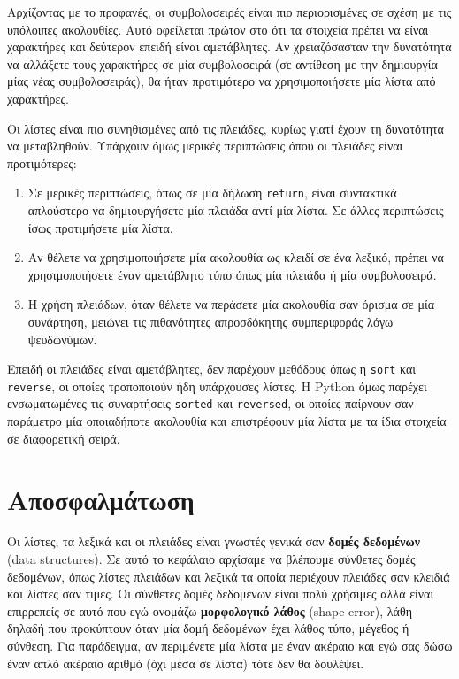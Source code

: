 \documentclass[10pt]{book}
\begin{document}
Αρχίζοντας με το προφανές, οι συμβολοσειρές είναι πιο περιορισμένες σε σχέση με τις υπόλοιπες ακολουθίες. Αυτό οφείλεται πρώτον στο ότι τα στοιχεία πρέπει να είναι χαρακτήρες και δεύτερον επειδή είναι αμετάβλητες. Αν χρειαζόσασταν την δυνατότητα να αλλάξετε τους χαρακτήρες σε μία συμβολοσειρά (σε αντίθεση με την δημιουργία μίας νέας συμβολοσειράς), θα ήταν προτιμότερο να χρησιμοποιήσετε μία λίστα από χαρακτήρες.

Οι λίστες είναι πιο συνηθισμένες από τις πλειάδες, κυρίως γιατί έχουν τη δυνατότητα να μεταβληθούν. Υπάρχουν όμως μερικές περιπτώσεις όπου οι πλειάδες είναι προτιμότερες:

\begin{enumerate}

\item  Σε μερικές περιπτώσεις, όπως σε μία δήλωση {\tt return}, είναι συντακτικά απλούστερο να δημιουργήσετε μία πλειάδα αντί μία λίστα. Σε άλλες περιπτώσεις ίσως προτιμήσετε μία λίστα.

\item  Αν θέλετε να χρησιμοποιήσετε μία ακολουθία ως κλειδί σε ένα λεξικό, πρέπει να χρησιμοποιήσετε έναν αμετάβλητο τύπο όπως μία πλειάδα ή μία συμβολοσειρά. 

\item  Η χρήση πλειάδων, όταν θέλετε να περάσετε μία ακολουθία σαν όρισμα σε μία συνάρτηση, μειώνει τις πιθανότητες απροσδόκητης συμπεριφοράς λόγω ψευδωνύμων.

\end{enumerate}

Επειδή οι πλειάδες είναι αμετάβλητες, δεν παρέχουν μεθόδους όπως η  {\tt sort}  και {\tt reverse}, οι οποίες τροποποιούν ήδη υπάρχουσες λίστες. Η Python όμως παρέχει ενσωματωμένες τις συναρτήσεις {\tt sorted} και {\tt reversed}, οι οποίες παίρνουν σαν παράμετρο μία οποιαδήποτε ακολουθία και επιστρέφουν μία λίστα με τα ίδια στοιχεία σε διαφορετική σειρά.
 


\section{Αποσφαλμάτωση}

Οι λίστες, τα λεξικά και οι πλειάδες είναι γνωστές γενικά σαν {\bf δομές δεδομένων} (data structures). Σε αυτό το κεφάλαιο αρχίσαμε να βλέπουμε σύνθετες δομές δεδομένων, όπως λίστες πλειάδων και λεξικά τα οποία περιέχουν πλειάδες σαν κλειδιά και λίστες σαν τιμές. Οι σύνθετες δομές δεδομένων είναι πολύ χρήσιμες αλλά είναι επιρρεπείς σε αυτό που εγώ ονομάζω {\bf μορφολογικό λάθος} (shape error), λάθη δηλαδή που προκύπτουν όταν μία δομή δεδομένων έχει λάθος τύπο, μέγεθος ή σύνθεση. Για παράδειγμα, αν περιμένετε μία λίστα με έναν ακέραιο και εγώ σας δώσω έναν απλό ακέραιο αριθμό (όχι μέσα σε λίστα) τότε δεν θα δουλέψει.
\end{document}

